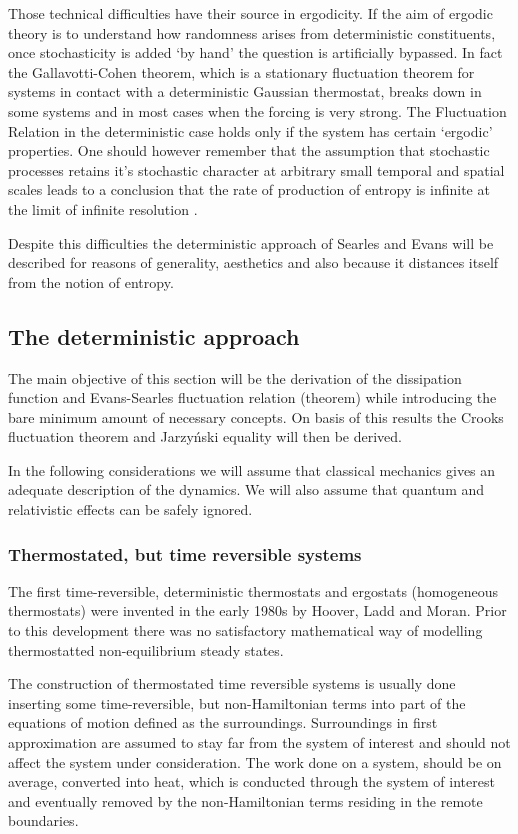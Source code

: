 \documentclass[a4paper,12pt]{article}
\begin{document}
Those technical difficulties have their source in ergodicity. If the aim of ergodic theory is to understand how randomness arises from deterministic constituents, once stochasticity is added ‘by hand’ the question is artificially bypassed.
In fact the Gallavotti-Cohen theorem, which is a stationary fluctuation theorem for systems in contact with a deterministic Gaussian thermostat, breaks down in some systems and in most cases when the forcing is very strong. The Fluctuation Relation in the deterministic case holds only if the system has certain ‘ergodic’ properties\cite{Kurchan:2009ub}. 
One should however remember that the assumption that stochastic processes retains it's stochastic character at arbitrary small temporal and spatial scales leads to a conclusion that the rate of production of entropy is infinite at the limit of infinite resolution \cite{Dorfman:ozm67-zD}.

Despite this difficulties the deterministic approach of Searles and Evans will be described for reasons of generality, aesthetics and also because it distances itself from the notion of entropy.

\subsection{The deterministic approach}

The main objective of this section will be the derivation of the dissipation function and Evans-Searles fluctuation relation (theorem) while introducing the bare minimum amount of necessary concepts. On basis of this results the Crooks fluctuation theorem and Jarzyński equality will then be derived.  

In the following considerations we will assume that classical mechanics gives an adequate description of the dynamics. We will also assume that quantum and relativistic effects can be safely ignored.

\subsubsection{Thermostated, but time reversible systems}

The first time-reversible, deterministic thermostats and ergostats (homogeneous thermostats) were invented in the early 1980s by Hoover, Ladd and Moran. Prior to this development there was no satisfactory mathematical way of modelling thermostatted non-equilibrium steady states\cite{Hoover:1982dp}.

The construction of thermostated time reversible systems is usually done inserting some time-reversible, but non-Hamiltonian terms into part of the equations of motion defined as the surroundings. Surroundings in first approximation are assumed to stay far from the system of interest and should not affect the system under consideration.
The work done on a system, should be on average, converted into heat, which is conducted through the system of interest and eventually removed by the non-Hamiltonian terms residing in the remote boundaries.
\end{document}
